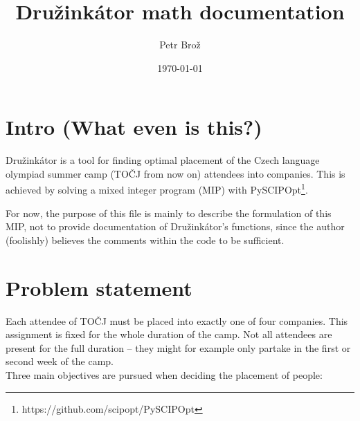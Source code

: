 \documentclass[11pt]{article}
\title{Družinkátor math documentation}
\author{Petr Brož}
\date{\today}
\begin{document}
\maketitle	
\pagebreak



\section{Intro (What even is this?)}

Družinkátor is a tool for finding optimal placement of the Czech language olympiad summer camp (TOČJ from now on) attendees into companies.
This is achieved by solving a mixed integer program (MIP) with PySCIPOpt\footnote{https://github.com/scipopt/PySCIPOpt}.

For now, the purpose of this file is mainly to describe the formulation of this MIP, not to provide documentation of Družinkátor's functions, since the 
author (foolishly) believes the comments within the code to be sufficient.

\section{Problem statement}

Each attendee of TOČJ must be placed into exactly one of four companies.  This assignment is fixed for the whole duration of the camp.  Not all attendees are
present for the full duration -- they might for example only partake in the first or second week of the camp. \\

Three main objectives are pursued when deciding the placement of people:
\end{document}
